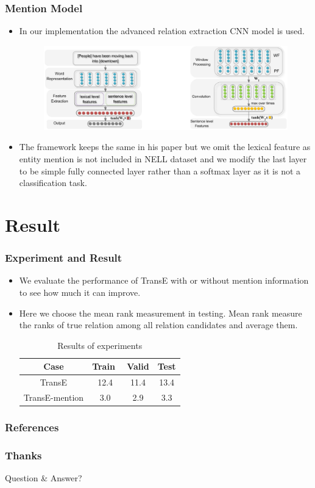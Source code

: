 \documentclass[pdf,10pt]{beamer}
\begin{document}
\begin{frame}
    \frametitle{Mention Model}
    \begin{itemize}
        \item In our implementation the advanced relation extraction CNN model\citep{zeng2014relation} is used.
            \begin{figure}
				\includegraphics[width=.85\textwidth]{10.eps}
            \end{figure}
        \item The framework keeps the same in his paper but we omit the lexical feature as entity mention is not included in NELL dataset and we modify the last layer to be simple fully connected layer rather than a softmax layer as it is not a classification task.
    \end{itemize}
\end{frame}

\section{Result}
\begin{frame}
\frametitle{Experiment and Result}
    \begin{itemize}
        \item We evaluate the performance of TransE with or without mention information to see how much it can improve.
        \item Here we choose the mean rank measurement in testing. Mean rank measure the ranks of true relation among all relation candidates and average them.
    \begin{table}[htp]
        \caption{Results of experiments}
        \begin{tabular}{c c c c}
            \hline \hline
            Case & Train $$& Valid & Test \\
            \hline
            TransE & 12.4 & 11.4 & 13.4 \\
            TransE-mention & 3.0 & 2.9 & 3.3 \\
            \hline \hline
        \end{tabular}
    \end{table}
\end{itemize}
\end{frame}

\begin{frame}[allowframebreaks]
\frametitle{References}

\end{frame}

\begin{frame}
	\frametitle{Thanks}
	Question \& Answer?
\end{frame}
\end{document}
